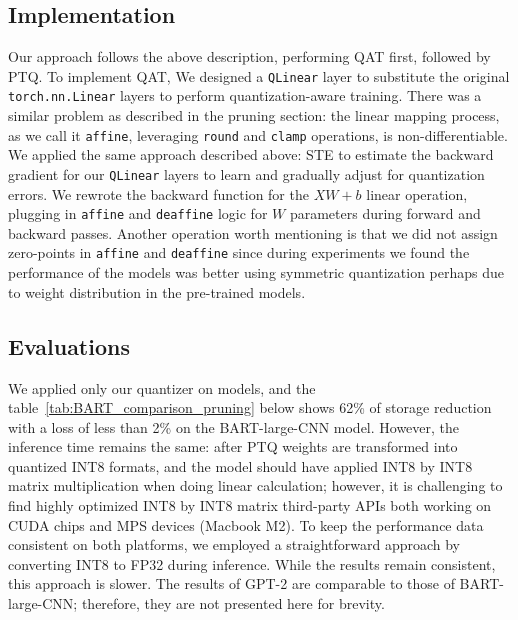 \documentclass{article}
\begin{document}
    \subsection{Implementation}
    \hspace*{1em} Our approach follows the above description, performing QAT first, followed by PTQ. To implement QAT, We designed a \texttt{QLinear} layer to substitute the original \texttt{torch.nn.Linear} layers to perform quantization-aware training. There was a similar problem as described in the pruning section: the linear mapping process, as we call it \texttt{affine}, leveraging \texttt{round} and \texttt{clamp} operations, is non-differentiable. We applied the same approach described above: STE to estimate the backward gradient for our \texttt{QLinear} layers to learn and gradually adjust for quantization errors. We rewrote the backward function for the $XW + b$ linear operation, plugging in \texttt{affine} and \texttt{deaffine} logic for $W$ parameters during forward and backward passes. Another operation worth mentioning is that we did not assign zero-points in \texttt{affine} and \texttt{deaffine} since during experiments we found the performance of the models was better using symmetric quantization perhaps due to weight distribution in the pre-trained models.

    \subsection{Evaluations}

    \hspace*{1em} We applied only our quantizer on models, and the table~\ref{tab:BART_comparison_pruning} below shows 62\% of storage reduction with a loss of less than 2\% on the BART-large-CNN model. However, the inference time remains the same: after PTQ weights are transformed into quantized INT8 formats, and the model should have applied INT8 by INT8 matrix multiplication when doing linear calculation; however, it is challenging to find highly optimized INT8 by INT8 matrix third-party APIs both working on CUDA chips and MPS devices (Macbook M2). To keep the performance data consistent on both platforms, we employed a straightforward approach by converting INT8 to FP32 during inference. While the results remain consistent, this approach is slower. The results of GPT-2 are comparable to those of BART-large-CNN; therefore, they are not presented here for brevity.
\end{document}
